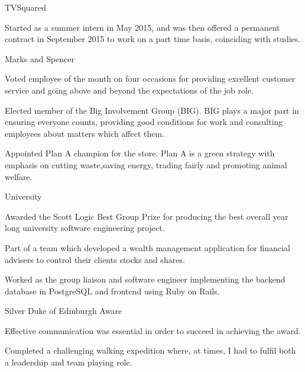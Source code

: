 \begin{cventries}
  \cventry
    {TVSquared}
    {}
    {}
    {}
    {
      \begin{cvitems}
        \item {Started as a summer intern in May 2015, and was then offered a permanent contract in September 2015 to work on a part time basis, coinciding with studies.}
      \end{cvitems}
    }
  \cventry
    {Marks and Spencer}
    {}
    {}
    {}
    {
      \begin{cvitems}
        \item {Voted employee of the month on four occasions for providing excellent customer service and going above and beyond the expectations of the job role.}
        \item {Elected member of the Big Involvement Group (BIG). BIG plays a major part in ensuring everyone counts, providing good conditions for work and consulting employees about matters which affect them.}
        \item {Appointed Plan A champion for the store. Plan A is a green strategy with emphasis on cutting waste,saving energy, trading fairly and promoting animal welfare.}
      \end{cvitems}
    }
  \cventry
    {University}
    {}
    {}
    {}
    {
      \begin{cvitems}
        \item {Awarded the Scott Logic Best Group Prize for producing the best overall year long university software engineering project.}
        \item {Part of a team which developed a wealth management application for financial advisers to control their clients stocks and shares.}
        \item {Worked as the group liaison and software engineer implementing the backend database in PostgreSQL and frontend using Ruby on Rails.}
      \end{cvitems}
    }
  \cventry
    {Silver Duke of Edinburgh Aware}
    {}
    {}
    {}
    {
      \begin{cvitems}
        \item {Effective communication was essential in order to succeed in achieving the award.}
        \item {Completed a challenging walking expedition where, at times, I had to fulfil both a leadership and team playing role.}
      \end{cvitems}
    }
\end{cventries}

